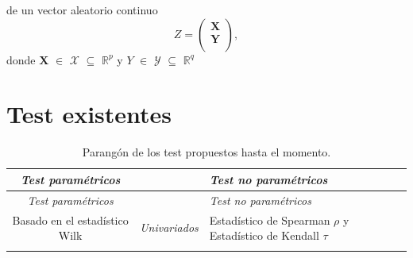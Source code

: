 \documentclass[]{book}
\begin{document}
de un vector aleatorio continuo \[ Z = \mathbf{\begin{pmatrix} X\\
Y\\
\end{pmatrix}},\] donde \(\mathbf{X}\) \(\in\) \(\mathcal{X}\)
\(\subseteq\) \(\mathbb{R}^p\) y \(Y\) \(\in\) \(\mathcal{Y}\)
\(\subseteq\) \(\mathbb{R}^q\)

\section{Test existentes}\label{test-existentes}

\begin{longtable}[]{@{}ccl@{}}
\caption{Parangón de los test propuestos hasta el
momento.}\tabularnewline
\toprule
\begin{minipage}[b]{0.25\columnwidth}\centering\strut
\emph{Test paramétricos}\strut
\end{minipage} & \begin{minipage}[b]{0.10\columnwidth}\centering\strut
\strut
\end{minipage} & \begin{minipage}[b]{0.56\columnwidth}\raggedright\strut
\emph{Test no paramétricos}\strut
\end{minipage}\tabularnewline
\midrule
\endfirsthead
\toprule
\begin{minipage}[b]{0.25\columnwidth}\centering\strut
\emph{Test paramétricos}\strut
\end{minipage} & \begin{minipage}[b]{0.10\columnwidth}\centering\strut
\strut
\end{minipage} & \begin{minipage}[b]{0.56\columnwidth}\raggedright\strut
\emph{Test no paramétricos}\strut
\end{minipage}\tabularnewline
\midrule
\endhead
\begin{minipage}[t]{0.25\columnwidth}\centering\strut
Basado en el estadístico Wilk\strut
\end{minipage} & \begin{minipage}[t]{0.10\columnwidth}\centering\strut
\emph{\emph{Univariados}}\strut
\end{minipage} & \begin{minipage}[t]{0.56\columnwidth}\raggedright\strut
Estadístico de Spearman \(\rho\) y Estadístico de Kendall \(\tau\)\strut
\end{minipage}\tabularnewline
\begin{minipage}[t]{0.25\columnwidth}\centering\strut

\end{minipage}
\end{longtable}
\end{document}
